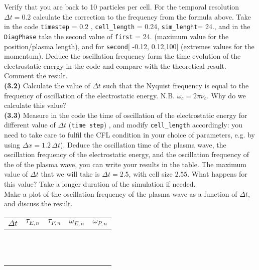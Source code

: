 \documentclass[11pt,a4paper]{article}
\begin{document}
 Verify that you are back to 10 particles per cell. For the temporal resolution $\Delta t = 0.2$ calculate the correction to the frequency from the formula above.  Take in the code \texttt{timestep} = 0.2 , \texttt{cell\_length} = 0.24, \texttt{sim\_lenght}= 24., and in the \texttt{DiagPhase} take the second value of   \texttt{first} = 24. (maximum value for the position/plasma length), and for \texttt{second}[ -0.12, 0.12,100] (extremes values for the momentum).   Deduce the oscillation frequency form the time evolution of the electrostatic energy in the code and compare with the theoretical result. Comment the result. \\
{\bf (3.2)} Calculate the value of $\Delta t $ such that the Nyquist frequency is equal to the frequency of oscillation of the electrostatic energy. N.B. $\omega_c = 2 \pi \nu_c$. Why do we calculate this value? \\
{\bf (3.3)} Measure in the code  the time of oscillation of the electrostatic energy for different value of $\Delta t$ (\texttt{time step}) , and modify \texttt{cell\_length} accordingly: you need to take care to fulfil the CFL condition in your choice of parameters, e.g. by using $\Delta x = 1.2\,\Delta t$). Deduce the oscillation time of the plasma wave, the oscillation frequency of the electrostatic energy, and the oscillation frequency of the of the plasma wave, you can write your results in the table. The maximum value of $\Delta t $ that we will take is $\Delta t = 2.5$, with cell size $2.55$. What happens for this value? Take a longer duration of the simulation if needed. \\
 Make a plot of the oscillation frequency of the plasma wave as a function of $\Delta t$, and discuss the result. \\


\begin{tabularx}{0.95\textwidth}{X|X|X|X|X}
\centering\large\textbf{$\Delta t$} & \centering\large\textbf{$\tau_{E,n}$} & \centering\large\textbf{$\tau_{P,n}$} &  \centering\large\textbf{$\omega_{E,n}$} & \centering\arraybackslash\large\textbf{$\omega_{P,n}$} \\
\hline
 & & & & \\  & & & & \\ \hline  & & & & \\  & & & & \\ \hline  & & & & \\  & & & & \\ \hline  & & & & \\  & & & & \\ \hline  & & & & \\  & & & & \\ \hline  & & & & \\  & & & & \\ 
\end{tabularx}
\end{document}
